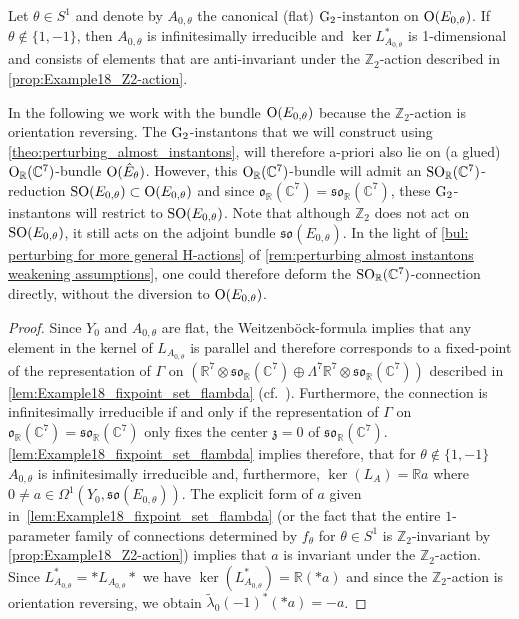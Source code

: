 \documentclass[11pt,a4paper]{scrartcl}
\newcommand{\G}{\textup{G}}
\newcommand{\SO}{\textup{SO}}
\renewcommand{\O}{\textup{O}}
\numberwithin{equation}{section}
\theoremstyle{plain}
\theoremstyle{definition}
\theoremstyle{remark}
\begin{document}
\begin{proposition}\label{prop:example18_ker(L_A)}
Let $\theta\in S^1$ and denote by $A_{0,\theta}$ the canonical (flat) $\G_2$-instanton on $\O(E_{0,\theta})$. If $\theta \notin\{1,-1\}$, then $A_{0,\theta}$ is infinitesimally irreducible and $\ker L_{A_{0,\theta}}^*$ is 1-dimensional and consists of elements that are anti-invariant under the $\mathbb{Z}_2$-action described in \autoref{prop:Example18_Z2-action}. 
\end{proposition}
\begin{remark}\label{rem:example18-explanation O(14)-bundle I}
In the following we work with the bundle $\O(E_{0,\theta})$ because the $\mathbb{Z}_2$-action is orientation reversing. The $\G_2$-instantons that we will construct using \autoref{theo:perturbing_almost_instantons}, will therefore a-priori also lie on (a glued) $\O_{\mathbb{R}}(\mathbb{C}^7)$-bundle $\O(\hat{E}_{\theta})$. However, this $\O_{\mathbb{R}}(\mathbb{C}^7)$-bundle will admit an $\SO_{\mathbb{R}}(\mathbb{C}^7)$-reduction $\SO(E_{0,\theta})\subset \O(E_{0,\theta})$ and since $\mathfrak{o}_{\mathbb{R}}(\mathbb{C}^7)=\mathfrak{so}_{\mathbb{R}}(\mathbb{C}^7)$, these $\G_2$-instantons will restrict to $\SO(E_{0,\theta})$. Note that although $\mathbb{Z}_2$ does not act on $\SO(E_{0,\theta})$, it still acts on the adjoint bundle $\mathfrak{so}(E_{0,\theta})$. In the light of \autoref{bul: perturbing for more general H-actions} of \autoref{rem:perturbing almost instantons weakening assumptions}, one could therefore deform the $\SO_{\mathbb{R}}(\mathbb{C}^7)$-connection directly, without the diversion to $\O(E_{0,\theta})$.
\end{remark}
\begin{proof}
Since $Y_0$ and $A_{0,\theta}$ are flat, the Weitzenböck-formula implies that any element in the kernel of $L_{A_{0,\theta}}$ is parallel and therefore corresponds to a fixed-point of the representation of $\Gamma$ on $(\mathbb{R}^7\otimes \mathfrak{so}_\mathbb{R}(\mathbb{C}^7) \oplus \Lambda^7\mathbb{R}^7\otimes \mathfrak{so}_\mathbb{R}(\mathbb{C}^7))$ described in \autoref{lem:Example18_fixpoint_set_flambda} (cf.~\cite[Proposition~9.2]{Walpuski-InstantonsKummer}). Furthermore, the connection is infinitesimally irreducible if and only if the representation of $\Gamma$ on $\mathfrak{o}_\mathbb{R}(\mathbb{C}^7) = \mathfrak{so}_\mathbb{R}(\mathbb{C}^7)$ only fixes the center $\mathfrak{z} = 0$ of $\mathfrak{so}_\mathbb{R}(\mathbb{C}^7)$. \autoref{lem:Example18_fixpoint_set_flambda} implies therefore, that for $\theta\notin \{1,-1\}$ $A_{0,\theta}$ is infinitesimally irreducible and, furthermore, $\ker(L_A) = \mathbb{R}a$ where $0 \neq a \in \Omega^1(Y_0,\mathfrak{so}({E_{0,\theta}}))$. The explicit form of $a$ given in~\autoref{lem:Example18_fixpoint_set_flambda} (or the fact that the entire $1$-parameter family of connections  determined by $f_\theta$ for $\theta\in S^1$ is $\mathbb{Z}_2$-invariant by \autoref{prop:Example18_Z2-action}) implies that $a$ is invariant under the $\mathbb{Z}_2$-action. Since $L_{A_{0,\theta}}^* = * L_{A_{0,\theta}} *$ we have $\ker(L_{A_{0,\theta}}^*)=\mathbb{R}(*a)$ and since the $\mathbb{Z}_2$-action is orientation reversing, we obtain $\tilde{\lambda}_0(-1)^* (*a) = -a$.
\end{proof}
\end{document}
